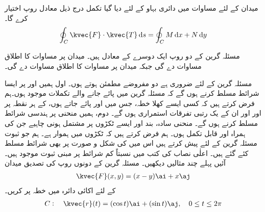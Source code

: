 میدان  کے لئے  مساوات  میں دائری بہاو کے لئے دیا گیا تکمل درج ذیل معادل روپ اختیار کرے گا۔
\begin{align*}
\oint_C\kvec{F}\cdot \kvec{T}\dif s=\oint_C M\dif x+N\dif y
\end{align*}

مسئلہ گرین کے دو روپ ایک دوسرے کے  معادل ہیں۔ میدان  پر مساوات  کا اطلاق مساوات  دے گی جبکہ میدان  پر مساوات  کا اطلاق مساوات  دے گی۔

مسئلہ گرین کے لئے ضروری ہے  دو مفروضے مطمئن ہوتے ہوں۔ اول ہمیں  اور  پر ایسا شرائط مسلط کرنے ہوں گے کہ مسئلہ گرین میں پائے جانے والے تکملات موجود ہوں۔ہم فرض کرتے ہیں کہ کسی ایسے کھلا خطہ، جس میں  اور  پائے جاتے ہوں، کے ہر نقطہ پر  اور  اور ان کے یک رتبی تفرقات استمراری ہوں گے۔ دوم، ہمیں منحنی  پر ہندسی شرائط مسلط کرنے ہوں گے۔ منحنی سادہ، بند اور ایسے  ٹکڑوں پر مشتمل ہونی چاہیے جن کی ہمراہ  اور  قابل تکمل ہوں۔ ہم فرض کرتے ہیں کہ  ٹکڑوں میں ہموار ہے۔ ہم جو ثبوت  مسئلہ گرین کے لئے پیش کرتے ہیں اس میں  کی شکل و صورت پر بھی شرائط مسلط کئے گئے ہیں۔ اعلٰی نصاب کی کتب میں نسبتاً کم شرائط پر مبنی ثبوت موجود ہیں۔ آئیں پہلے چند مثالیں دیکھیں۔
مسئلہ گرین کے دونوں روپ کی تصدیق میدان
\begin{align*}
\kvec{F}(x,y)=(x-y)\ai+x\aj
\end{align*}
کے لئے اکائی دائرہ  میں  خطہ  پر کریں۔
\begin{align*}
C:\quad \kvec{r}(t)=(\cos t)\ai+(\sin t)\aj,\quad 0\le t\le 2\pi
\end{align*}
